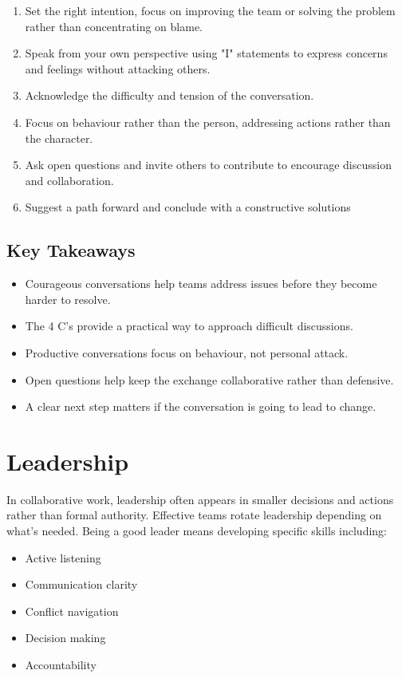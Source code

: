 \documentclass{report}
\begin{document}
		\begin{enumerate}
			\item Set the right intention, focus on improving the team or solving the problem rather than concentrating on blame.
			\item Speak from your own perspective using "I" statements to express concerns and feelings without attacking others.
			\item Acknowledge the difficulty and tension of the conversation.
			\item Focus on behaviour rather than the person, addressing actions rather than the character.
			\item Ask open questions and invite others to contribute to encourage discussion and collaboration.
			\item Suggest a path forward and conclude with a constructive solutions
		\end{enumerate}

		\subsection{Key Takeaways}
			
			\begin{itemize}
				\item Courageous conversations help teams address issues before they become harder to resolve.
				\item The 4 C's provide a practical way to approach difficult discussions.
				\item Productive conversations focus on behaviour, not personal attack.
				\item Open questions help keep the exchange collaborative rather than defensive.
				\item A clear next step matters if the conversation is going to lead to change.
			\end{itemize}

	\section{Leadership}

		In collaborative work, leadership often appears in smaller decisions and actions rather than formal authority. Effective teams rotate leadership depending on what's needed. Being a good leader means developing specific skills including:

		\begin{itemize}
			\item Active listening
			\item Communication clarity
			\item Conflict navigation
			\item Decision making
			\item Accountability
		\end{itemize}
\end{document}
